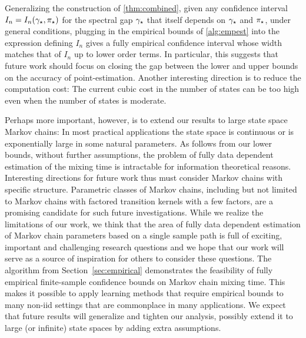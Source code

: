 Generalizing the construction of  \cref{thm:combined}, 
given any confidence interval $I_n=I_n(\gamma_{\star},\pi_{\star})$ for the spectral gap $\gamma_{\star}$ that itself depends 
on $\gamma_{\star}$ and $\pi_{\star}$, under general conditions,
plugging in the empirical bounds of \cref{alg:empest} into the expression defining $I_n$
gives a fully empirical confidence interval whose
width matches that of $I_n$ up to lower order terms.
In particular, this suggests that future work should focus on 
closing the gap between the lower and upper bounds on the accuracy
of point-estimation. Another interesting direction is to 
reduce the computation cost: The current cubic cost in the number of states
can be too high even when the number of states is moderate.

Perhaps more important, however, is to extend 
our results to large state space Markov chains:
In most practical applications the state space is continuous
or is exponentially large in some natural parameters.
As follows from our lower bounds, without further assumptions,
the problem of fully data dependent estimation of the mixing time
is intractable for information theoretical reasons.
Interesting directions for future work thus must consider Markov
chains with specific structure. Parametric classes of Markov chains,
including but not limited to Markov chains with factored transition kernels
with a few factors, are a promising candidate for such future investigations.
While we realize the limitations of our work, 
we think that the area of fully data dependent estimation of Markov chain 
parameters based on a single sample path is full of exciting, important
and challenging research questions and we hope that our work will
serve as a source of inspiration for others to consider these questions.
The algorithm from Section~\ref{sec:empirical} demonstrates the
feasibility of fully empirical finite-sample confidence bounds on
Markov chain mixing time.
This makes it possible to apply learning methods that require
empirical bounds to many non-iid settings that are commonplace in many
applications.
We expect that future results will generalize and tighten our
analysis, possibly extend it to large (or infinite) state spaces by
adding extra assumptions.

